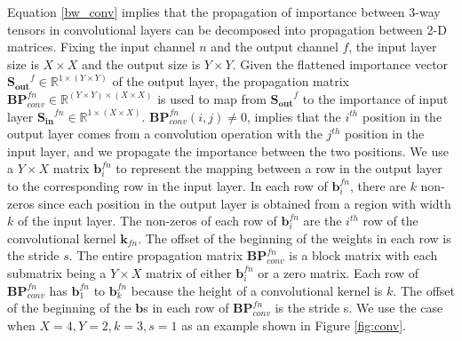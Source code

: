 \documentclass[10pt,twocolumn,letterpaper]{article}
\begin{document}
Equation \ref{bw_conv} implies that the propagation of importance between 3-way tensors in convolutional layers can be decomposed into propagation between 2-D matrices. 
Fixing the input channel $n$ and the output channel $f$, the input layer size is $X \times X$ and the output size is $Y \times Y$. 
Given the flattened importance vector $\mathbf{S_{out}}^f \in \mathbb{R}^ {1\times (Y \times Y )}$ of the output layer, the propagation matrix $\mathbf{BP}_{conv}^{fn} \in \mathbb{R}^ { (Y \times Y ) \times (X \times X)}$ is used to map from $\mathbf{S_{out}}^f$ to the importance of input layer $\mathbf{S_{in}}^{fn} \in \mathbb{R}^ {1\times (X \times X )}$. 
$\mathbf{BP}^{fn}_{conv}(i,j)\neq0$,  implies that the $i^{th}$ position in the output layer comes from a convolution operation with the $j^{th}$ position in the input layer, and we propagate the importance between the two positions.
We use a $Y \times X$ matrix $\mathbf{b}^{fn}_i$ to represent the mapping between a row in the output layer to the corresponding row in the input layer.
In each row of $\mathbf{b}^{fn}_i$, there are $k$ non-zeros since each position in the output layer is obtained from a region with width $k$ of the input layer. The non-zeros of each row of $\mathbf{b}^{fn}_i$ are the $i^{th}$ row of the convolutional kernel $\mathbf{k}_{fn}$.
The offset of the beginning of the weights in each row is the stride $s$. 
The entire propagation matrix $\mathbf{BP}_{conv}^{fn}$ is a block matrix with each submatrix being a $Y \times X$ matrix of either $\mathbf{b}_i^{fn}$ or a zero matrix. 
Each row of $\mathbf{BP}_{conv}^{fn}$ has $\mathbf{b}_1^{fn}$ to $\mathbf{b}_k^{fn}$ because the height of a convolutional kernel is $k$. 
The offset of the beginning of the $\mathbf{b}$s in each row of $\mathbf{BP}_{conv}^{fn}$ is the stride s. 
We use the case when $X=4, Y=2, k=3, s=1$ as an example shown in Figure \ref{fig:conv}.
\end{document}
